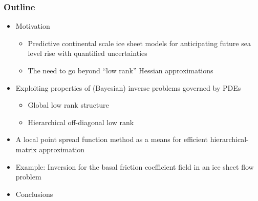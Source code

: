 \documentclass[10pt,final,xcolor=dvipsnames,aspect ratio=169]{beamer}
\begin{document}
\begin{frame}[t]
	\frametitle{Outline}
	
	\begin{itemize}
		\setlength\itemsep{1.0em}
		\item Motivation
		\vspace{0.02in}
		\begin{itemize}
			\setlength\itemsep{1.0em}
			\item Predictive continental scale ice sheet models for anticipating future sea level rise with quantified uncertainties
			\vspace{0.02in}
			\item The need to go beyond ``low rank'' Hessian approximations
		\end{itemize}
		\vspace{0.02in}
		\item Exploiting properties of (Bayesian) inverse problems governed by PDEs
		\vspace{0.02in}
		\begin{itemize}
			\setlength\itemsep{1.0em}
			\item Global low rank structure
			\vspace{0.02in}
			\item Hierarchical off-diagonal low rank
		\end{itemize}
				\vspace{0.02in}
	\item A local point spread function method as a means for efficient
	hierarchical-matrix approximation
		\vspace{0.02in}
		\item Example: Inversion for the basal friction
		coefficient field in an ice sheet flow problem
		\vspace{0.02in}
		\item Conclusions
	\end{itemize}
	
\end{frame}
\end{document}
